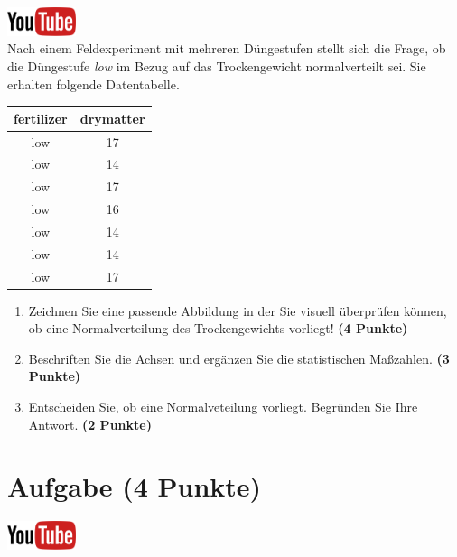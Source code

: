 \documentclass[a4paper, 10pt]{scrartcl}\usepackage[]{graphicx}\usepackage[]{xcolor}
\begin{document}
\hfill\href{https://youtu.be/VX4Hs81h8_A}{\includegraphics[width =
  2cm]{img/youtube}}\\[1Ex]

Nach einem Feldexperiment mit mehreren D{\"u}ngestufen stellt sich die Frage,
ob die D{\"u}ngestufe \textit{low} im Bezug auf das Trockengewicht
normalverteilt sei. Sie erhalten folgende Datentabelle.

\begin{table}[!h]
\centering
\begin{tabular}{cc}
\toprule
fertilizer & drymatter\\
\midrule
low & 17\\
low & 14\\
low & 17\\
low & 16\\
low & 14\\
\addlinespace
low & 14\\
low & 17\\
\bottomrule
\end{tabular}
\end{table}



\begin{enumerate}
\item Zeichnen Sie eine passende Abbildung in der Sie visuell {\"u}berpr{\"u}fen
  k{\"o}nnen, ob eine Normalverteilung des Trockengewichts vorliegt! \textbf{(4
    Punkte)}
\item Beschriften Sie die Achsen und erg{\"a}nzen Sie die statistischen
  Ma{\ss}zahlen. \textbf{(3 Punkte)}
\item Entscheiden Sie, ob eine Normalveteilung vorliegt. Begr{\"u}nden Sie Ihre
  Antwort. \textbf{(2 Punkte)}
\end{enumerate} 
\clearpage

\section{Aufgabe \hfill (4 Punkte)}

\hfill\href{https://youtu.be/Op-gjzASH9I}{\includegraphics[width =
  2cm]{img/youtube}}\\[1Ex]
\end{document}
